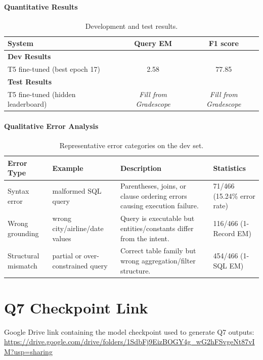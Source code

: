 \documentclass{article}
\begin{document}
\paragraph{Quantitative Results}
\begin{table}[h!]
\centering
\begin{tabular}{lcc}
  \toprule
  System & Query EM & F1 score \\
  \midrule
  \multicolumn{3}{l}{\textbf{Dev Results}} \\
  \midrule
  T5 fine-tuned (best epoch 17) & 2.58 & 77.85 \\
  \midrule
  \multicolumn{3}{l}{\textbf{Test Results}} \\
  \midrule
  T5 fine-tuned (hidden leaderboard) & \textit{Fill from Gradescope} & \textit{Fill from Gradescope} \\
  \bottomrule
\end{tabular}
\caption{Development and test results.}
\label{tab:results}
\end{table}

\paragraph{Qualitative Error Analysis}
\begin{table}[h!]
  \centering
  \begin{tabular}{p{2cm}p{3cm}p{5cm}p{3cm}}
    \toprule
    \textbf{Error Type} & \textbf{Example} & \textbf{Description} & \textbf{Statistics} \\
    \midrule
    Syntax error & malformed SQL query & Parentheses, joins, or clause ordering errors causing execution failure. & 71/466 (15.24\% error rate) \\
    \midrule
    Wrong grounding & wrong city/airline/date values & Query is executable but entities/constants differ from the intent. & 116/466 (1-Record EM) \\
    \midrule
    Structural mismatch & partial or over-constrained query & Correct table family but wrong aggregation/filter structure. & 454/466 (1-SQL EM) \\
    \bottomrule
  \end{tabular}
  \caption{Representative error categories on the dev set.}
  \label{tab:qualitative}
\end{table}

\section*{Q7 Checkpoint Link}
Google Drive link containing the model checkpoint used to generate Q7 outputs:
\href{https://drive.google.com/drive/folders/1SdbFj9EizBOGY4g_wG2hFSvgeNt87vIM?usp=sharing}{\url{https://drive.google.com/drive/folders/1SdbFj9EizBOGY4g_wG2hFSvgeNt87vIM?usp=sharing}}
\end{document}
